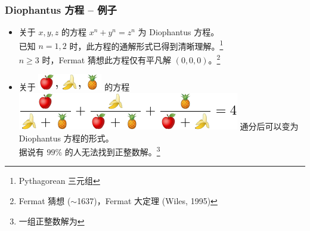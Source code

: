 \documentclass{../pkslide}
\begin{document}
\begin{frame}
  \frametitle{Diophantus 方程 -- 例子}
  \begin{examples}[Diophantus 方程]
    \begin{itemize}
      \item<2-> 关于 $x, y, z$ 的方程 $x^n + y^n = z^n$ 为 Diophantus 方程。\\
        已知 $n = 1, 2$ 时，此方程的通解形式已得到清晰理解。\footnote<2->{Pythagorean 三元组}\\
        \-\hspace{2em} $n \ge 3$ 时，Fermat 猜想此方程仅有平凡解 $(0, 0, 0)$。\footnote<2->{Fermat 猜想 ($\sim$1637)，Fermat 大定理 (Wiles, 1995)}
      \item<3-> 关于 \includegraphics[align = c]{pics/fruits.pdf} 的方程 \includegraphics[align = c]{pics/fruits_equation.pdf} 通分后可以变为 Diophantus 方程的形式。\\
        据说有 $99 \%$ 的人无法找到正整数解。\footnote<3->{一组正整数解为}
    \end{itemize}
  \end{examples}
  
\end{frame}
\end{document}
